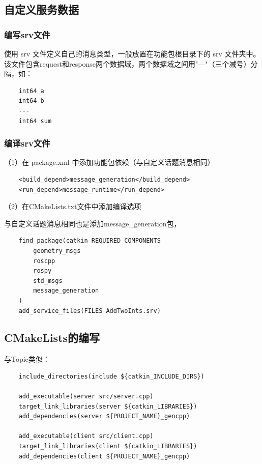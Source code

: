 \documentclass[10pt, oneside]{book}
\begin{document}
\subsection{自定义服务数据}

\subsubsection{编写srv文件}

使用 srv 文件定义自己的消息类型，一般放置在功能包根目录下的 srv 文件夹中。该文件包含request和response两个数据域，两个数据域之间用"---"（三个减号）分隔，如：

\begin{verbatim}
    int64 a
    int64 b
    ---
    int64 sum
\end{verbatim}

\subsubsection{编译srv文件}

（1）在 package.xml 中添加功能包依赖（与自定义话题消息相同）

\begin{verbatim}
    <build_depend>message_generation</build_depend>
    <run_depend>message_runtime</run_depend>
\end{verbatim}

（2）在CMakeLists.txt文件中添加编译选项

与自定义话题消息相同也是添加message\_generation包，

\begin{verbatim}
    find_package(catkin REQUIRED COMPONENTS
        geometry_msgs
        roscpp
        rospy
        std_msgs
        message_generation
    )
    add_service_files(FILES AddTwoInts.srv)
\end{verbatim}

\subsection{CMakeLists的编写}

与Topic类似：

\begin{verbatim}
    include_directories(include ${catkin_INCLUDE_DIRS})
            
    add_executable(server src/server.cpp)
    target_link_libraries(server ${catkin_LIBRARIES})
    add_dependencies(server ${PROJECT_NAME}_gencpp)

    add_executable(client src/client.cpp)
    target_link_libraries(client ${catkin_LIBRARIES})
    add_dependencies(client ${PROJECT_NAME}_gencpp)
\end{verbatim}
\end{document}
